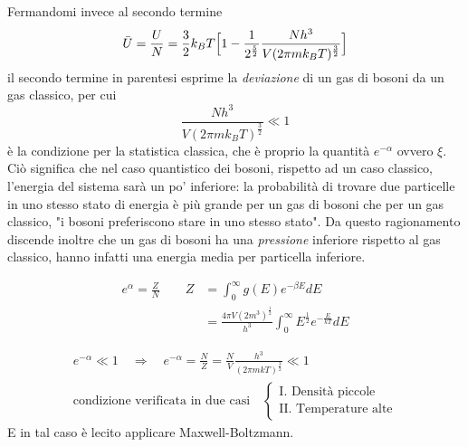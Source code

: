 Fermandomi invece al secondo termine
\begin{equation}
\bar U = \frac{U}{N} = \frac{3}{2} k_B T \Bigl[  1 - \frac{1}{2^{ \frac{5}{2} }}  \frac{N h^3}{V (2\pi m k_B T)^{ \frac{3}{2} }}  \Bigr]
\end{equation}
il secondo termine in parentesi esprime la \textit{deviazione} di un gas di bosoni da un gas classico, per cui
\begin{equation}
\frac{N h^3}{V (2\pi m k_B T)^{ \frac{3}{2} }}  \ll 1 
\end{equation}
è la condizione per la statistica classica, che è proprio la quantità $e^{-\alpha}$ ovvero $\xi$.
Ciò significa che nel caso quantistico dei bosoni, rispetto ad un caso classico, l'energia del sistema sarà un po' inferiore:
la probabilità di trovare due particelle in uno stesso stato di energia è più grande per un gas di bosoni che per un gas classico, "i bosoni preferiscono stare in uno stesso stato".
Da questo ragionamento discende inoltre che un gas di bosoni ha una \textit{pressione} inferiore rispetto al gas classico, hanno infatti una energia media per particella inferiore.










\newpage

\begin{equation}
\begin{split}
e^{\alpha} = \frac{Z}{N} \quad\quad Z & = \int_0^{\infty} g(E) e^{-\beta E} dE \\
& = \frac{4 \pi V (2m^3)^\frac{1}{2}}{h^3} \int_0^{\infty} E^{\frac{1}{2}} e^{-\frac{E}{kT}} dE
\end{split}
\end{equation}

\begin{equation}
\begin{split}
e^{-\alpha} \ll 1 \quad \Rightarrow \quad e^{-\alpha} = \frac{N}{Z} = \frac{N}{V} \frac{h^3}{(2 \pi m k T)^{\frac{3}{2}}} \ll 1 \\
\mbox{condizione verificata in due casi} \quad
\begin{cases} 
	\mbox{I.  Densità piccole} \\
	\mbox{II. Temperature alte}
\end{cases}
\end{split}
\end{equation}
E in tal caso è lecito applicare Maxwell-Boltzmann.

